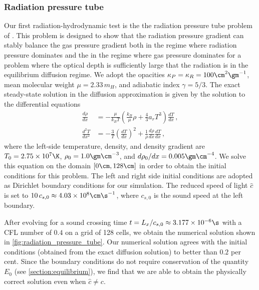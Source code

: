 \documentclass[fleqn,usenatbib]{mnras}
\begin{document}
\subsubsection{Radiation pressure tube}
Our first radiation-hydrodynamic test is the the radiation pressure tube problem of \cite{Krumholz_2007}. This problem is designed to show that the radiation pressure gradient can stably balance the gas pressure gradient both in the regime where radiation pressure dominates and the in the regime where gas pressure dominates for a problem where the optical depth is sufficiently large that the radiation is in the equilibrium diffusion regime. We adopt the opacities $\kappa_P = \kappa_R = 100 \cm^2 \gm^{-1}$, mean molecular weight $\mu = 2.33 \, m_H$, and adiabatic index $\gamma = 5/3$. The exact steady-state solution in the diffusion approximation is given by the solution to the differential equations
\begin{align}
\frac{d \rho}{dx} &= -\frac{\mu}{k_B T} \left( \frac{k_B}{\mu} \rho + \frac{4}{3} a_r T^3 \right) \frac{dT}{dx} \, , \\
\frac{d^2 T}{dx^2} &= -\frac{3}{T} \left(\frac{dT}{dx}\right)^2 + \frac{1}{\rho} \frac{d\rho}{dx} \frac{dT}{dx} \, ,
\end{align}
where the left-side temperature, density, and density gradient are $T_0 = 2.75 \times 10^7 \K$, $\rho_0 = 1.0 \gm \cm^{-3}$, and ${d\rho_0}/{dx} = 0.005 \gm \cm^{-4}$. We solve this equation on the domain $[0 \cm, 128 \cm]$ in order to obtain the initial conditions for this problem. The left and right side initial conditions are adopted as Dirichlet boundary conditions for our simulation. The reduced speed of light $\hat c$ is set to $10 \, c_{s,0} \approx 4.03 \times 10^8 \cm \s^{-1}$, where $c_{s,0}$ is the sound speed at the left boundary.

After evolving for a sound crossing time $t = L_x / c_{s,0} \approx 3.177 \times 10^{-6} \s$ with a CFL number of $0.4$ on a grid of 128 cells, we obtain the numerical solution shown in \autoref{fig:radiation_pressure_tube}. Our numerical solution agrees with the initial conditions (obtained from the exact diffusion solution) to better than $0.2$ per cent. Since the boundary conditions do not require conservation of the quantity $E_0$ (see \autoref{section:equilibrium}), we find that we are able to obtain the physically correct solution even when $\hat c \neq c$.
\end{document}
